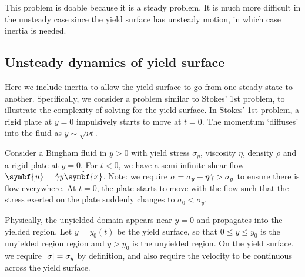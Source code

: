 \documentclass{jknotes}
\begin{document}
This problem is doable because it is a steady problem. It is much more
difficult in the unsteady case since the yield surface has unsteady motion, in
which case inertia is needed.

\subsection{Unsteady dynamics of yield surface}
Here we include inertia to allow the yield surface to go from one steady state
to another. Specifically, we consider a problem similar to Stokes' 1st
problem, to illustrate the complexity of solving for the yield surface. In
Stokes' 1st problem, a rigid plate at $y=0$ impulsively starts to move at
$t=0$. The momentum `diffuses' into the fluid as $y \sim \sqrt{\nu t}$.

Consider a Bingham fluid in $y > 0$ with yield stress $\sigma_y$, viscosity
$\eta$, density $\rho$ and a rigid plate at $y=0$. For $t < 0$, we have a
semi-infinite shear flow $\symbf{u} = \srate y \hat{\symbf{x}}$. Note: we require
$\sigma = \sigma_y + \eta \dot{\gamma} > \sigma_y$ to ensure there is flow everywhere. At
$t=0$, the plate starts to move with the flow such that the stress exerted on
the plate suddenly changes to $\sigma_0 < \sigma_y$. 

\begin{center}
\end{center}

Physically, the unyielded domain appears near $y=0$ and propagates into the
yielded region. Let $y=y_0(t)$ be the yield surface, so that $0 \le y \le
y_0$ is the unyielded region region and $y > y_0$ is the unyielded region. On
the yield surface, we require $\abs{\sigma} = \sigma_y$ by definition, and
also require the velocity to be continuous across the yield surface.
\end{document}
